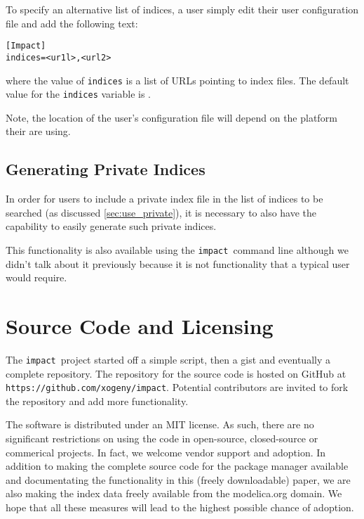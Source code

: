 \documentclass[11pt,a4paper,twocolumn]{article}
\newcommand{\impact}{\texttt{impact}} %
\newcommand{\code}[1]{\texttt{#1}} %
\begin{document}
To specify an alternative list of indices, a user simply edit their
user configuration file and add the following text:

\begin{verbatim}
[Impact]
indices=<ur1l>,<url2>
\end{verbatim}
where the value of \code{indices} is a list of URLs pointing to index files.  The default value for the \code{indices} variable is \code{}.


Note, the location of the user's configuration file will depend on the platform
their are using.

\subsection{Generating Private Indices}
\label{sec:gen_private}


In order for users to include a private index file in the list of indices to be 
searched (as discussed \ref{sec:use_private}), it is necessary to also have the
capability to easily generate such private indices.

This functionality is also available using the \impact\ command line although
we didn't talk about it previously because it is not functionality that a
typical user would require.



\section{Source Code and Licensing}
\label{sec:source}

The \impact\ project started off a simple script, then a gist and eventually a 
complete repository.  The repository for the source code is hosted on GitHub at
\code{https://github.com/xogeny/impact}.  Potential contributors are invited to 
fork the repository and add more functionality.

The software is distributed under an MIT license.  As such, there are no 
significant restrictions on using the code in open-source, closed-source or 
commerical projects.
In fact, we welcome vendor support and adoption.  In addition to making the 
complete source code for the package manager available and documentating the 
functionality in this (freely downloadable) paper, we are also making the index 
data freely available from the modelica.org domain.   We hope that all these 
measures will lead to the highest possible chance of adoption.
\end{document}
